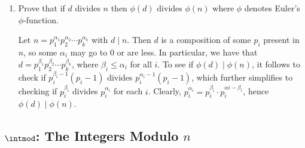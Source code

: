 \begin{enumerate}
\begin{sol}
        For some $N_0 \in \n$, there are finitely many $n$ such that $\phi(n) = N_0$. Then there are infinitely many $m > n$ such that $\phi(m) > N_0$, or that $\phi(n)$ tends towards infinity.
    \end{sol}
    \item Prove that if $d$ divides $n$ then $\phi(d)$ divides $\phi(n)$ where $\phi$ denotes Euler's $\phi$-function.
    \begin{sol}
        Let $n = p_1^{\alpha_1}p_2^{\alpha_2} \cdots p_k^{\alpha_k}$ with $d \mid n$. Then $d$ is a composition of some $p_i$ present in $n$, so some $\alpha_i$ may go to 0 or are less. In particular, we have that $d = p_1^{\beta_1}p_2^{\beta_2}\cdots p_k^{\beta_k}$, where $\beta_i \leq \alpha_i$ for all $i$. To see if $\phi(d) \mid \phi(n)$, it follows to check if $p_i^{\beta_i - 1}(p_i - 1)$ divides $p_i^{\alpha_i - 1}(p_i - 1)$, which further simplifies to checking if $p_i^{\beta_i}$ divides $p_i^{\alpha_i}$ for each $i$. Clearly, $p_i^{\alpha_i} = p_i^{\beta_i} \cdot p_i^{\alpha i - \beta_i}$, hence $\phi(d) \mid \phi(n)$.
    \end{sol}
\end{enumerate}

\subsection{\texorpdfstring{$\intmod$: The Integers Modulo $n$}{Z/nZ: The Integers Modulo n}}

